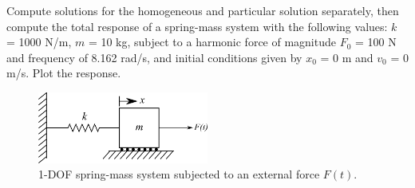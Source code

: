 \documentclass[12pt,letter]{article}
\begin{document}
\begin{example}

	Compute solutions for the homogeneous and particular solution separately, then compute the total response of a spring-mass system with the following values: $k$ = 1000 N/m, $m$ = 10 kg, subject to a harmonic force of magnitude $F_0$ = 100 N and frequency of 8.162 rad/s, and initial conditions given by $x_0$ = 0 m and $v_0$ = 0 m/s. Plot the response.
	
	\begin{figure}[H]
		\centering
		\includegraphics[width=0.5\textwidth]{../figures/1-DOF-spring_mass_horizontal_forced.png}
		\caption{1-DOF spring-mass system subjected to an external force $F(t)$.}
	\end{figure}
	

\end{example}
\end{document}

